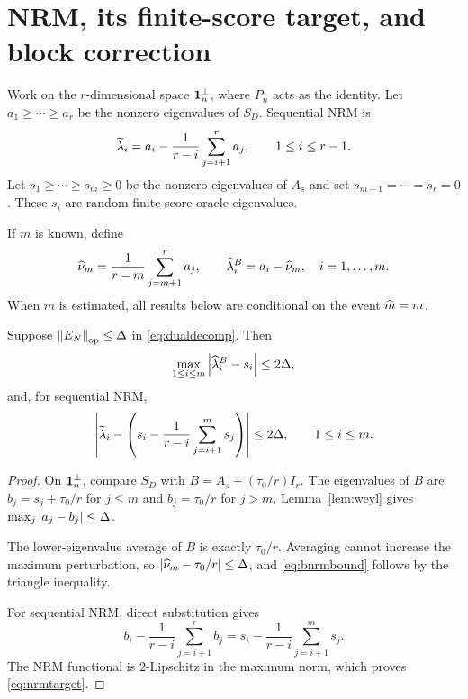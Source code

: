 \section{NRM, its finite-score target, and block correction}\label{sec:nrm}
Work on the $r$-dimensional space $\mathbf{1}_n^\perp$, where $P_n$ acts as the identity.  Let $a_1\ge\cdots\ge a_r$ be the nonzero eigenvalues of $S_D$.  Sequential NRM is
\begin{equation}\label{eq:nrm}
\widetilde{\lambda}_i=a_i-\frac1{r-i}\sum_{j=i+1}^r a_j,\qquad 1\le i\le r-1.
\end{equation}
Let $s_1\ge\cdots\ge s_m\ge0$ be the nonzero eigenvalues of $A_s$ and set $s_{m+1}=\cdots=s_r=0$.  These $s_i$ are random finite-score oracle eigenvalues.

\begin{definition}\label{def:bnrm}
If $m$ is known, define
\begin{equation}\label{eq:bnrm}
\widehat{\nu}_m=\frac1{r-m}\sum_{j=m+1}^r a_j,
\qquad \widehat{\lambda}_i^B=a_i-\widehat{\nu}_m,\quad i=1,\ldots,m.
\end{equation}
When $m$ is estimated, all results below are conditional on the event $\widehat{m}=m$.
\end{definition}

\begin{theorem}\label{thm:oracle}
Suppose $\left\lVert E_N\right\rVert_{\mathrm{op}}\le\Delta$ in \eqref{eq:dualdecomp}.  Then
\begin{equation}\label{eq:bnrmbound}
\max_{1\le i\le m}\left\lvert\widehat{\lambda}_i^B-s_i\right\rvert\le2\Delta,
\end{equation}
and, for sequential NRM,
\begin{equation}\label{eq:nrmtarget}
\left\lvert\widetilde{\lambda}_i-\left(s_i-\frac1{r-i}\sum_{j=i+1}^m s_j\right)\right\rvert\le2\Delta,
\qquad 1\le i\le m.
\end{equation}
\end{theorem}
\begin{proof}
On $\mathbf{1}_n^\perp$, compare $S_D$ with $B=A_s+(\tau_0/r)I_r$.  The eigenvalues of $B$ are $b_j=s_j+\tau_0/r$ for $j\le m$ and $b_j=\tau_0/r$ for $j>m$.  Lemma~\ref{lem:weyl} gives $\max_j\left\lvert a_j-b_j\right\rvert\le\Delta$.

The lower-eigenvalue average of $B$ is exactly $\tau_0/r$.  Averaging cannot increase the maximum perturbation, so $\left\lvert\widehat{\nu}_m-\tau_0/r\right\rvert\le\Delta$, and \eqref{eq:bnrmbound} follows by the triangle inequality.

For sequential NRM, direct substitution gives
\begin{equation}
 b_i-\frac1{r-i}\sum_{j=i+1}^r b_j
 =s_i-\frac1{r-i}\sum_{j=i+1}^m s_j.
\end{equation}
The NRM functional is $2$-Lipschitz in the maximum norm, which proves \eqref{eq:nrmtarget}.
\end{proof}

